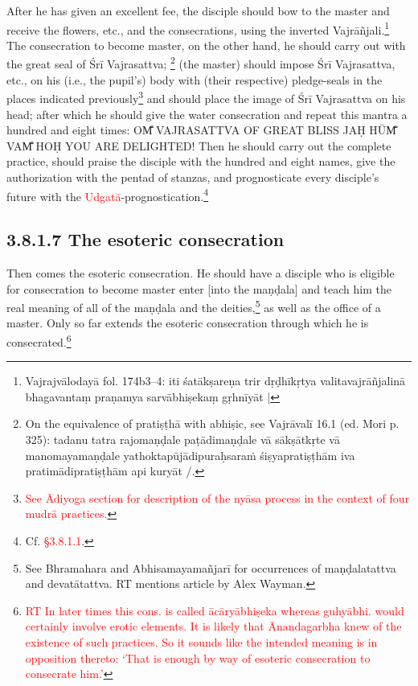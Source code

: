 \documentclass[11pt]{book}
\makeatletter
\def\fakesc#1{%
  \begingroup%
  \xdef\fake@name{\csname\curr@fontshape/\f@size\endcsname}%
  \fontsize{1.3\fontdimen8\fake@name}{\baselineskip}\selectfont%
  \uppercase{#1}%
  \endgroup%
}
\newcommand{\mantra}[1]{\fakesc{#1}}
\newcommand{\red}[1]{\textcolor{red}{#1}}
\makeatother
\begin{document}
After he has given an excellent fee, the disciple should bow to the master and receive the flowers, etc., and the consecrations, using the inverted Vajrāñjali.\footnote{
Vajrajvālodayā fol. 174b3–4: iti śatākṣareṇa trir dṛḍhīkṛtya valitavajrāñjalinā bhagavantaṃ praṇamya sarvābhiṣekaṃ gṛhnīyāt |} The consecration to become master, on the other hand, he should carry out with the great seal of Śrī Vajrasattva;
\footnote{On the equivalence of pratiṣṭhā with abhiṣic, see Vajrāvalī 16.1 (ed. Mori p. 325): tadanu tatra rajomaṇḍale paṭādimaṇḍale vā sākṣātkṛte vā manomayamaṇḍale yathoktapūjādipuraḥsaraṁ śiṣyapratiṣṭhām iva pratimādipratiṣṭhām api kuryāt /.} (the master) should impose Śrī Vajrasattva, etc., on his (i.e., the pupil's) body with (their respective) pledge-seals in the places indicated previously\footnote{\red{See Ādiyoga section for description of the nyāsa process in the context of four mudrā practices.}} and should place the image of Śrī Vajrasattva on his head; after which he should give the water consecration and repeat this mantra a hundred and eight times: \mantra{Om̐ Vajrasattva of great bliss jaḥ hūm̐ vam̐ hoḥ you are delighted!} Then he should carry out the complete practice, should praise the disciple with the hundred and eight names, give the authorization with the pentad of stanzas, and prognosticate every disciple's future with the \red{Udgatā}-prognostication.\footnote{Cf. \red{§3.8.1.1}.}


\subsection{3.8.1.7 The esoteric consecration}

Then comes the esoteric consecration. He should have a disciple who is eligible for consecration to become master enter [into the maṇḍala] and teach him the real meaning of all of the maṇḍala and the deities,\footnote{See Bhramahara and Abhisamayamañjarī for occurrences of maṇḍalatattva and devatātattva. RT mentions article by Alex Wayman.} as well as the office of a master. Only so far extends the esoteric consecration through which he is consecrated.\footnote{\red{RT In later times this cons. is called ācāryābhiṣeka whereas guhyābhi. would certainly involve erotic elements. It is likely that Ānandagarbha knew of the existence of such practices. So it sounds like the intended meaning is in opposition thereto: `That is enough by way of esoteric consecration to consecrate him.'}}
\end{document}
